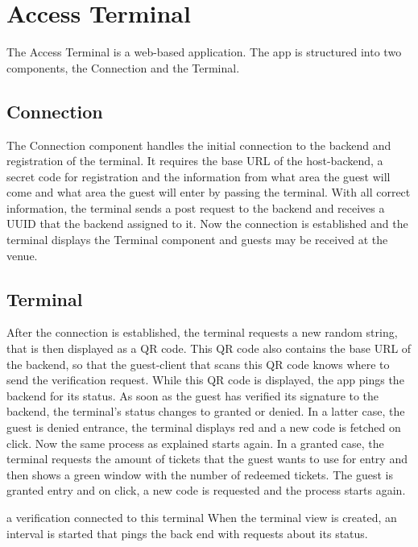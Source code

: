 \section{Access Terminal}\label{imp:terminal}
The Access Terminal is a web-based application.
The app is structured into two components, the Connection and the Terminal.

\subsection{Connection}
The Connection component handles the initial connection to the backend and registration of the terminal. It requires the base URL of the host-backend, a secret code for registration and the information from what area the guest will come and what area the guest will enter by passing the terminal. With all correct information, the terminal sends a post request to the backend and receives a UUID that the backend assigned to it. Now the connection is established and the terminal displays the Terminal component and guests may be received at the venue.

\subsection{Terminal}
After the connection is established, the terminal requests a new random string, that is then displayed as a QR code. This QR code also contains the base URL of the backend, so that the guest-client that scans this QR code knows where to send the verification request. While this QR code is displayed, the app pings the backend for its status. As soon as the guest has verified its signature to the backend, the terminal's status changes to granted or denied. In a latter case, the guest is denied entrance, the terminal displays red and a new code is fetched on click. Now the same process as explained starts again. In a granted case, the terminal requests the amount of tickets that the guest wants to use for entry and then shows a green window with the number of redeemed tickets. The guest is granted entry and on click, a new code is requested and the process starts again.



a verification connected to this terminal
When the terminal view is created, an interval is started that pings the back end with requests about its status. 

